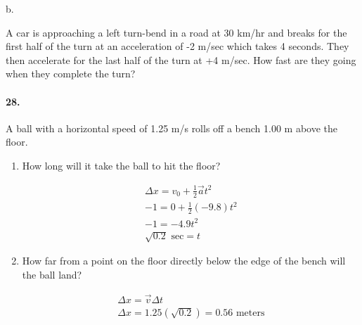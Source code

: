 \begin{multicols*}{2}
\begin{mdframed}
            b.
            
            A car is approaching a left turn-bend in a road at 30 km/hr and breaks for the first half of the turn at an acceleration of -2 m/sec which takes 4 seconds. They then accelerate for the last half of the turn at +4 m/sec. How fast are they going when they complete the turn?
        \end{mdframed}
        
        \paragraph*{28.}
        A ball with a horizontal speed of 1.25 m/s rolls off a bench 1.00 m above the floor.

        \begin{enumerate}[label=\alph*.]
            \item How long will it take the ball to hit the floor?
            
            \begin{mdframed}
                \begin{equation*}
                    \begin{gathered}
                        \Delta x = v_0 + \frac{1}{2}\vec{a}t^2  \\
                        -1 = 0 + \frac{1}{2}(-9.8)t^2   \\
                        -1 = -4.9t^2    \\
                        \boxed{\sqrt{0.2} \text{ sec} = t}
                    \end{gathered}
                \end{equation*}
            \end{mdframed}

            \item How far from a point on the floor directly below the edge of
            the bench will the ball land?\

            \begin{mdframed}
                \begin{equation*}
                    \begin{gathered}
                        \Delta x = \vec{v}\Delta t  \\
                        \Delta x = 1.25(\sqrt{0.2}) = \boxed{0.56 \text{ meters}}
                    \end{gathered}
                \end{equation*}
            \end{mdframed}
        \end{enumerate}


\end{multicols*}
